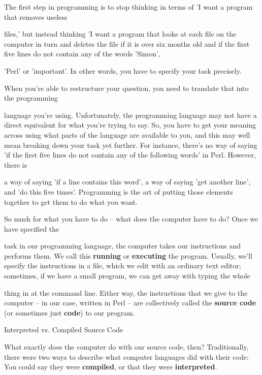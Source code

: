 \documentclass[a4paper,11pt]{book}
\begin{document}
\noindent The first step in programming is to stop thinking in terms of 'I want a program that removes useless

\noindent files,' but instead thinking 'I want a program that looks at each file on the computer in turn and deletes the file if it is over six months old and if the first five lines do not contain any of the words 'Simon',

\noindent 'Perl' or 'important'. In other words, you have to specify your task precisely.

\noindent 

\noindent When you're able to restructure your question, you need to translate that into the programming

\noindent language you're using. Unfortunately, the programming language may not have a direct equivalent for what you're trying to say. So, you have to get your meaning across using what parts of the language are available to you, and this may well mean breaking down your task yet further. For instance, there's no way of saying 'if the first five lines do not contain any of the following words' in Perl. However, there is

\noindent a way of saying 'if a line contains this word', a way of saying 'get another line', and 'do this five times'. Programming is the art of putting those elements together to get them to do what you want.

\noindent 

\noindent So much for what you have to do -- what does the computer have to do? Once we have specified the

\noindent task in our programming language, the computer takes our instructions and performs them. We call this \textbf{running }or \textbf{executing }the program. Usually, we'll specify the instructions in a file, which we edit with an ordinary text editor; sometimes, if we have a small program, we can get away with typing the whole

\noindent thing in at the command line. Either way, the instructions that we give to the computer -- in our case, written in Perl -- are collectively called the \textbf{source code }(or sometimes just \textbf{code}) to our program.

\noindent 

\noindent Interpreted vs. Compiled Source Code

\noindent 

\noindent What exactly does the computer do with our source code, then? Traditionally, there were two ways to describe what computer languages did with their code: You could say they were \textbf{compiled}, or that they were \textbf{interpreted}.
\end{document}
